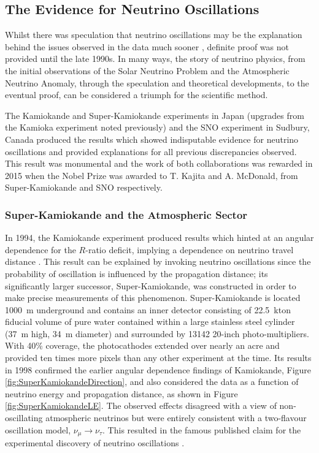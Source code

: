 \subsection{The Evidence for Neutrino Oscillations}\label{sec:EvidenceNeutrinoOscillations}

Whilst there was speculation that neutrino oscillations may be the explanation behind the issues observed in the data much sooner \cite{Casper1991,BeckerSzendy1992}, definite proof was not provided until the late 1990s.  In many ways, the story of neutrino physics, from the initial observations of the Solar Neutrino Problem and the Atmospheric Neutrino Anomaly, through the speculation and theoretical developments, to the eventual proof, can be considered a triumph for the scientific method.

The Kamiokande and Super-Kamiokande experiments in Japan (upgrades from the Kamioka experiment noted previously) and the SNO experiment in Sudbury, Canada produced the results which showed indisputable evidence for neutrino oscillations and provided explanations for all previous discrepancies observed.  This result was monumental and the work of both collaborations was rewarded in 2015 when the Nobel Prize was awarded to T. Kajita and A. McDonald, from Super-Kamiokande and SNO respectively.

\subsubsection{Super-Kamiokande and the Atmospheric Sector}\label{sec:SuperKamiokande}

In 1994, the Kamiokande experiment produced results which hinted at an angular dependence for the $R$-ratio deficit, implying a dependence on neutrino travel distance \cite{Kamiokande1994}.  This result can be explained by invoking neutrino oscillations since the probability of oscillation is influenced by the propagation distance; its significantly larger successor, Super-Kamiokande, was constructed in order to make precise measurements of this phenomenon.  Super-Kamiokande is located 1000~m underground and contains an inner detector consisting of 22.5~kton fiducial volume of pure water contained within a large stainless steel cylinder (37~m high, 34~m diameter) and surrounded by 13142 20-inch photo-multipliers.  With 40\% coverage, the photocathodes extended over nearly an acre and provided ten times more pixels than any other experiment at the time.  Its results in 1998 confirmed the earlier angular dependence findings of Kamiokande, Figure \ref{fig:SuperKamiokandeDirection}, and also considered the data as a function of neutrino energy and propagation distance, as shown in Figure \ref{fig:SuperKamiokandeLE}.  The observed effects disagreed with a view of non-oscillating atmospheric neutrinos but were entirely consistent with a two-flavour oscillation model, $\nu_{\mu} \rightarrow \nu_{\tau}$.  This resulted in the famous published claim for the experimental discovery of neutrino oscillations \cite{SuperKamiokande1998}.

